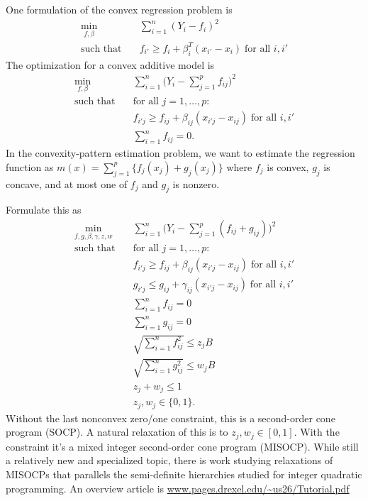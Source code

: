 \documentclass[12pt,pdftex]{imsart}
\numberwithin{equation}{section}
\theoremstyle{plain}
\theoremstyle{remark}
\begin{document}
\begin{frontmatter}
\end{frontmatter}

\par


One formulation of the convex regression problem is 
\begin{align}
\min_{f,\beta}\quad & \sum_{i=1}^n (Y_i - f_i)^2 \\
\text{such that}\quad & f_{i'} \geq f_i + \beta_i^T(x_{i'}-x_i)
              \; \text{for all $i,i'$}
\end{align}
The optimization for a convex additive model is
\begin{align}
\min_{f,\beta}\quad & \sum_{i=1}^n \bigl(Y_i - \sum_{j=1}^p f_{ij}\bigr)^2 \\
\text{such that}\quad & \text{for all $j=1,\ldots, p$:}\\
& f_{i'j} \geq f_{ij} + \beta_{ij}(x_{i'j}-x_{ij}) \; \text{for all $i,i'$}\\
& \sum_{i=1}^n f_{ij} = 0.
\end{align}
In the convexity-pattern estimation problem, we want to 
estimate the regression function as $m(x) = \sum_{j=1}^p
\bigl\{f_j(x_j) + g_j(x_j)\bigr\}$ where $f_j$ is convex, $g_j$ is concave,
and at most one of $f_j$ and $g_j$ is nonzero.

Formulate this as
\begin{align}
\min_{f,g,\beta,\gamma,z,w}\quad & \sum_{i=1}^n \bigl(Y_i - \sum_{j=1}^p (f_{ij}+g_{ij})\bigr)^2 \\
\text{such that}\quad 
  & \text{for all $j=1,\ldots, p$:}\\
  & f_{i'j} \geq f_{ij} + \beta_{ij}(x_{i'j}-x_{ij}) \; \text{for all $i,i'$}\\
  & g_{i'j} \leq g_{ij} + \gamma_{ij}(x_{i'j}-x_{ij})\; \text{for all $i,i'$}\\
  & \sum_{i=1}^n f_{ij} = 0 \\
  & \sum_{i=1}^n g_{ij} = 0 \\
  & \sqrt{\sum_{i=1}^n f_{ij}^2} \leq z_j B \\
  & \sqrt{\sum_{i=1}^n g_{ij}^2} \leq w_j B \\
  & z_j + w_j \leq 1\\
  & z_j, w_j \in \{0,1\}.
\end{align}
Without the last nonconvex zero/one constraint, this is a
second-order cone program (SOCP).  A natural relaxation of this is
to $z_j, w_j \in[0,1]$.  With the constraint it's a mixed integer
second-order cone program (MISOCP).  While still a relatively new and
specialized topic, there is work studying relaxations of MISOCPs
that parallels the semi-definite hierarchies studied for integer
quadratic programming.  An overview article is
\href{http://www.pages.drexel.edu/~us26/Tutorial.pdf}{www.pages.drexel.edu/\~{}us26/Tutorial.pdf}
\end{document}
